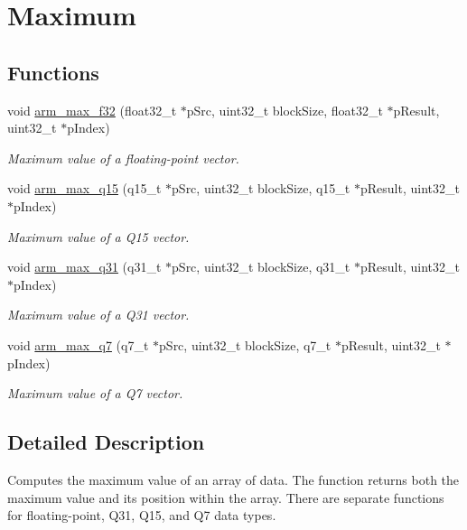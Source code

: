 \hypertarget{group___max}{\section{Maximum}
\label{group___max}
}
\subsection*{Functions}
\begin{DoxyCompactItemize}
\item 
void \hyperlink{group___max_ga5b89d1b04575aeec494f678695fb87d8}{arm\-\_\-max\-\_\-f32} (float32\-\_\-t $\ast$p\-Src, uint32\-\_\-t block\-Size, float32\-\_\-t $\ast$p\-Result, uint32\-\_\-t $\ast$p\-Index)
\begin{DoxyCompactList}\small\item\em Maximum value of a floating-\/point vector. \end{DoxyCompactList}\item 
void \hyperlink{group___max_gac132856c68f4bf2a056eaad5921c7880}{arm\-\_\-max\-\_\-q15} (q15\-\_\-t $\ast$p\-Src, uint32\-\_\-t block\-Size, q15\-\_\-t $\ast$p\-Result, uint32\-\_\-t $\ast$p\-Index)
\begin{DoxyCompactList}\small\item\em Maximum value of a Q15 vector. \end{DoxyCompactList}\item 
void \hyperlink{group___max_gaff7cbd4e955382def06724cc4cc85795}{arm\-\_\-max\-\_\-q31} (q31\-\_\-t $\ast$p\-Src, uint32\-\_\-t block\-Size, q31\-\_\-t $\ast$p\-Result, uint32\-\_\-t $\ast$p\-Index)
\begin{DoxyCompactList}\small\item\em Maximum value of a Q31 vector. \end{DoxyCompactList}\item 
void \hyperlink{group___max_ga6afd64d381b5c232de59163ebfe71e35}{arm\-\_\-max\-\_\-q7} (q7\-\_\-t $\ast$p\-Src, uint32\-\_\-t block\-Size, q7\-\_\-t $\ast$p\-Result, uint32\-\_\-t $\ast$p\-Index)
\begin{DoxyCompactList}\small\item\em Maximum value of a Q7 vector. \end{DoxyCompactList}\end{DoxyCompactItemize}


\subsection{Detailed Description}
Computes the maximum value of an array of data. The function returns both the maximum value and its position within the array. There are separate functions for floating-\/point, Q31, Q15, and Q7 data types. 


